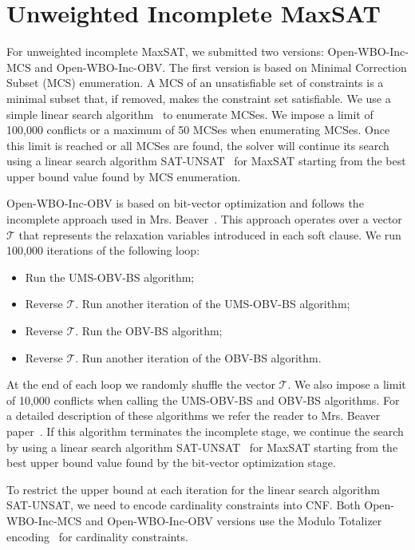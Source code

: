 \documentclass[conference]{IEEEtran}
\newcommand{\mcs}{\textsf{Open-WBO-Inc-MCS}\xspace}
\newcommand{\obv}{\textsf{Open-WBO-Inc-OBV}\xspace}
\begin{document}
\section{Unweighted Incomplete MaxSAT}
For unweighted incomplete MaxSAT, we submitted two versions: \mcs and \obv. The first version is based on Minimal Correction Subset (MCS) enumeration. A MCS of an unsatisfiable set of constraints is a minimal subset that, if removed, makes the constraint set satisfiable. We use a simple linear search algorithm~\cite{bls} to enumerate MCSes. We impose a limit of 100,000 conflicts or a maximum of 50 MCSes when enumerating MCSes. Once this limit is reached or all MCSes are found, the solver will continue its search using a linear search algorithm SAT-UNSAT~\cite{berre-jsat10} for MaxSAT starting from the best upper bound value found by MCS enumeration. 

\obv is based on bit-vector optimization and follows the incomplete approach used in \textsf{Mrs. Beaver}~\cite{beaver}. This approach operates over a vector $\mathcal T$ that represents the relaxation variables introduced in each soft clause. We run 100,000 iterations of the following loop:
\begin{itemize}
\item Run the \textsf{UMS-OBV-BS} algorithm;
\item Reverse $\mathcal T$. Run another iteration of the \textsf{UMS-OBV-BS} algorithm;
\item Reverse $\mathcal T$. Run the \textsf{OBV-BS} algorithm;
\item Reverse $\mathcal T$. Run another iteration of the \textsf{OBV-BS} algorithm.
\end{itemize}

At the end of each loop we randomly shuffle the vector $\mathcal T$. We also impose a limit of 10,000 conflicts when calling the \textsf{UMS-OBV-BS} and \textsf{OBV-BS} algorithms. For a detailed description of these algorithms we refer the reader to \textsf{Mrs. Beaver} paper~\cite{beaver}. If this algorithm terminates the incomplete stage, we continue the search by using a linear search algorithm SAT-UNSAT~\cite{berre-jsat10} for MaxSAT starting from the best upper bound value found by the bit-vector optimization stage.

To restrict the upper bound at each iteration for the linear search algorithm SAT-UNSAT, we need to encode cardinality constraints into CNF. Both \mcs and \obv versions use the Modulo Totalizer encoding~\cite{totalizer-ictai13} for cardinality constraints.
\end{document}
